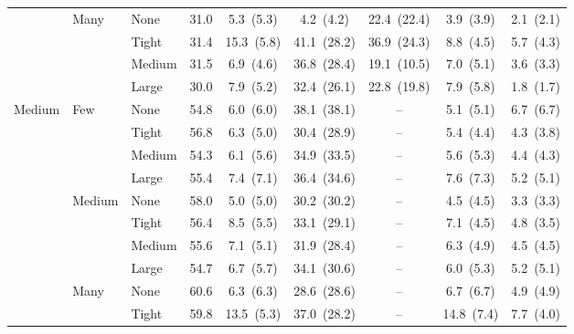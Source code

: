 \begin{table}[htbp]
{\begin{tabular}{lll c ccccc}
 & \multirow{4}{*}{\small Many} & {\small None} & 31.0 & 5.3~{\scriptsize(5.3)} & 4.2~{\scriptsize(4.2)} & 22.4~{\scriptsize(22.4)} & 3.9~{\scriptsize(3.9)} & 2.1~{\scriptsize(2.1)} \\
 &  & {\small Tight} & 31.4 & 15.3~{\scriptsize(5.8)} & 41.1~{\scriptsize(28.2)} & 36.9~{\scriptsize(24.3)} & 8.8~{\scriptsize(4.5)} & 5.7~{\scriptsize(4.3)} \\
 &  & {\small Medium} & 31.5 & 6.9~{\scriptsize(4.6)} & 36.8~{\scriptsize(28.4)} & 19.1~{\scriptsize(10.5)} & 7.0~{\scriptsize(5.1)} & 3.6~{\scriptsize(3.3)} \\
 &  & {\small Large} & 30.0 & 7.9~{\scriptsize(5.2)} & 32.4~{\scriptsize(26.1)} & 22.8~{\scriptsize(19.8)} & 7.9~{\scriptsize(5.8)} & 1.8~{\scriptsize(1.7)} \\
\midrule
\multirow{12}{*}{\small Medium} & \multirow{4}{*}{\small Few} & {\small None} & 54.8 & 6.0~{\scriptsize(6.0)} & 38.1~{\scriptsize(38.1)} & -- & 5.1~{\scriptsize(5.1)} & 6.7~{\scriptsize(6.7)} \\
 &  & {\small Tight} & 56.8 & 6.3~{\scriptsize(5.0)} & 30.4~{\scriptsize(28.9)} & -- & 5.4~{\scriptsize(4.4)} & 4.3~{\scriptsize(3.8)} \\
 &  & {\small Medium} & 54.3 & 6.1~{\scriptsize(5.6)} & 34.9~{\scriptsize(33.5)} & -- & 5.6~{\scriptsize(5.3)} & 4.4~{\scriptsize(4.3)} \\
 &  & {\small Large} & 55.4 & 7.4~{\scriptsize(7.1)} & 36.4~{\scriptsize(34.6)} & -- & 7.6~{\scriptsize(7.3)} & 5.2~{\scriptsize(5.1)} \\
 & \multirow{4}{*}{\small Medium} & {\small None} & 58.0 & 5.0~{\scriptsize(5.0)} & 30.2~{\scriptsize(30.2)} & -- & 4.5~{\scriptsize(4.5)} & 3.3~{\scriptsize(3.3)} \\
 &  & {\small Tight} & 56.4 & 8.5~{\scriptsize(5.5)} & 33.1~{\scriptsize(29.1)} & -- & 7.1~{\scriptsize(4.5)} & 4.8~{\scriptsize(3.5)} \\
 &  & {\small Medium} & 55.6 & 7.1~{\scriptsize(5.1)} & 31.9~{\scriptsize(28.4)} & -- & 6.3~{\scriptsize(4.9)} & 4.5~{\scriptsize(4.5)} \\
 &  & {\small Large} & 54.7 & 6.7~{\scriptsize(5.7)} & 34.1~{\scriptsize(30.6)} & -- & 6.0~{\scriptsize(5.3)} & 5.2~{\scriptsize(5.1)} \\
 & \multirow{4}{*}{\small Many} & {\small None} & 60.6 & 6.3~{\scriptsize(6.3)} & 28.6~{\scriptsize(28.6)} & -- & 6.7~{\scriptsize(6.7)} & 4.9~{\scriptsize(4.9)} \\
 &  & {\small Tight} & 59.8 & 13.5~{\scriptsize(5.3)} & 37.0~{\scriptsize(28.2)} & -- & 14.8~{\scriptsize(7.4)} & 7.7~{\scriptsize(4.0)} \\

\end{tabular}}
\end{table}
